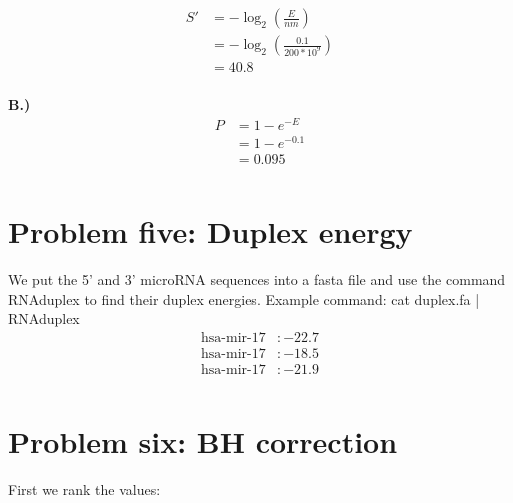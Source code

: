 \documentclass[10pt]{article} %
\begin{document}
\begin{align*}
  S' &= -\log_2\left(\frac{E}{nm}\right)\\
  &= -\log_2\left(\frac{0.1}{200*10^9}\right)\\
  &= 40.8\\
\end{align*}

\textbf{B.)}
\begin{align*}
  P &= 1 - e^{-E}\\
  &= 1 - e^{-0.1}\\
  &= 0.095\\
\end{align*}

\section{Problem five: Duplex energy}
We put the 5’ and 3’ microRNA sequences into a fasta file and use the
command RNAduplex to find their duplex energies. Example command:
cat duplex.fa | RNAduplex\\

\begin{align*}
  \mbox{hsa-mir-17}&: -22.7\\
  \mbox{hsa-mir-17}&: -18.5\\
  \mbox{hsa-mir-17}&: -21.9\\
\end{align*}

\section{Problem six: BH correction}
First we rank the values:
\end{document}

